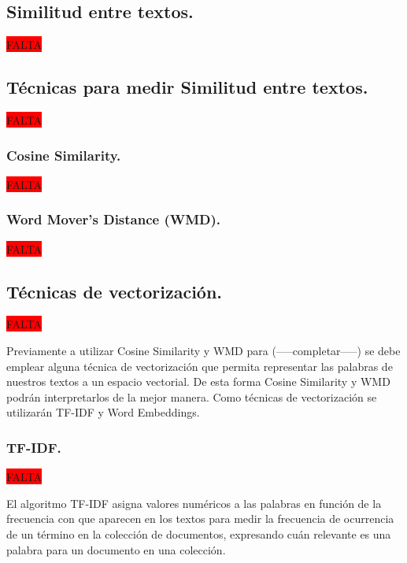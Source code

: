 \documentclass[12pt,a4paper]{article}
\begin{document}
\begin{sloppypar}
\cleardoublepage

\subsection{Similitud entre textos.}
\colorbox{red}{FALTA}

\cleardoublepage

\subsection{Técnicas para medir Similitud entre textos.}\label{Tecnicas_Simil_textos}
\colorbox{red}{FALTA}

\subsubsection{Cosine Similarity.}
\colorbox{red}{FALTA}

\cleardoublepage

\subsubsection{Word Mover's Distance (WMD).}
\colorbox{red}{FALTA}

\cleardoublepage

\subsection{Técnicas de vectorización.}
\colorbox{red}{FALTA}

Previamente a utilizar Cosine Similarity y WMD para (-----completar-----) se debe emplear alguna técnica de vectorización que permita representar las palabras de nuestros textos a un espacio vectorial. De esta forma Cosine Similarity y WMD podrán interpretarlos de la mejor manera. 
Como técnicas de vectorización se utilizarán TF-IDF y Word Embeddings.

\subsubsection{TF-IDF.}
\colorbox{red}{FALTA}

El algoritmo TF-IDF asigna valores numéricos a las palabras en función de la frecuencia con que aparecen en los textos para medir la frecuencia de ocurrencia de un término en la colección de documentos, expresando  cuán relevante es una palabra para un documento en una colección. 

\cleardoublepage


\end{sloppypar}
\end{document}
